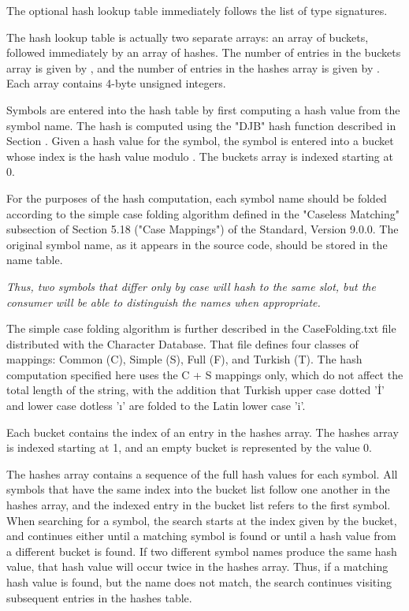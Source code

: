 The optional hash lookup table immediately follows the list of type signatures.

The hash lookup table is actually two separate arrays: an array of
buckets, followed immediately by an array of hashes. The number of
entries in the buckets array is given by \HFNbucketcount{}, and the number
of entries in the hashes array is given by \HFNnamecount{}. Each array
contains 4-byte unsigned integers.

Symbols are entered into the hash table by first computing a hash
value from the symbol name. The hash is computed 
using the "DJB" hash function 
described in Section .
Given a hash value for the symbol,
the symbol is entered into a bucket whose index is the hash value
modulo \HFNbucketcount{}. The buckets array is indexed starting at 0.

For the purposes of the hash computation, each symbol name should be
folded according to the simple case folding algorithm defined in the
"Caseless Matching" subsection of Section 5.18 ("Case Mappings") of
the  Standard, Version 9.0.0. The original symbol 
name, as it appears in the source code, should be stored in the name 
table.\db

\textit{Thus, two symbols that differ only by case will hash to
the same slot, but the consumer will be able to distinguish the names
when appropriate.}

The simple case folding algorithm is further described
in the CaseFolding.txt file distributed with the  
Character Database. That file defines four classes of mappings: 
Common (C), Simple (S), Full (F), and Turkish (T). 
The hash computation specified here uses the C + S mappings only, 
which do not affect the total length of the string, with the addition 
that Turkish upper case dotted '\.{I}' and lower case dotless '\i'
are folded to the Latin lower case 'i'.

Each bucket contains the index of an entry in the hashes array. The
hashes array is indexed starting at 1, and an empty bucket is
represented by the value 0.

The hashes array contains a sequence of the full hash values for each
symbol. All symbols that have the same index into the bucket list 
follow one another in the hashes array, and the indexed entry in 
the bucket list refers to the first symbol. 
When searching for a symbol, the search 
starts at the index given by the bucket, and continues either until a
matching symbol is found or until a hash value from a different bucket
is found. If two different symbol names produce the same hash value,
that hash value will occur twice in the hashes array. Thus, if a
matching hash value is found, but the name does not match, the search
continues visiting subsequent entries in the hashes table.

